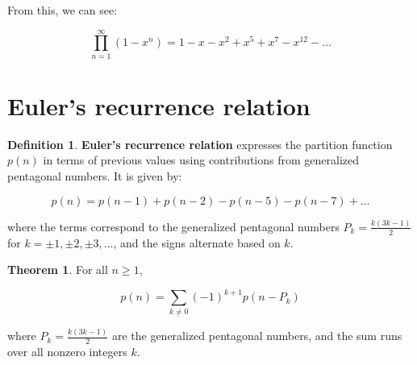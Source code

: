 \documentclass{article}
\theoremstyle{definition}
\newtheorem{definition}{Definition}
\newtheorem{theorem}{Theorem}
\begin{document}
\noindent
From this, we can see:

\[
\prod_{n=1}^{\infty} (1 - x^n) = 1 - x - x^2 + x^5 + x^7 - x^{12} - \dots
\]

\section{Euler's recurrence relation}

\begin{definition}
\textbf{Euler’s recurrence relation} expresses the partition function \( p(n) \) in terms of previous
values using contributions from generalized pentagonal numbers. It is given by:

\[
p(n) = p(n-1) + p(n-2) - p(n-5) - p(n-7) + \dots
\]

\noindent
where the terms correspond to the generalized pentagonal numbers \( P_k = \frac{k(3k-1)}{2} \) for
\( k = \pm 1, \pm 2, \pm 3, \dots \), and the signs alternate based on \( k \).

\end{definition}

\begin{theorem}
For all \( n \geq 1 \),

\[
p(n) = \sum_{k \neq 0} (-1)^{k+1} p(n - P_k)
\]

\noindent
where \( P_k = \frac{k(3k-1)}{2} \) are the generalized pentagonal numbers, and the sum runs over all
nonzero integers \( k \).

\end{theorem}
\end{document}
